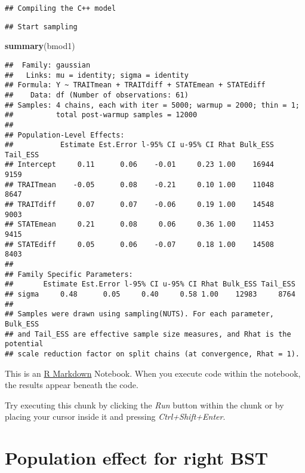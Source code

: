 \documentclass[
]{article}
\newenvironment{Shaded}{\begin{snugshade}}{\end{snugshade}}
\newcommand{\KeywordTok}[1]{\textcolor[rgb]{0.13,0.29,0.53}{\textbf{#1}}}
\newcommand{\NormalTok}[1]{#1}
\begin{document}
\begin{verbatim}
## Compiling the C++ model
\end{verbatim}

\begin{verbatim}
## Start sampling
\end{verbatim}

\begin{Shaded}
\begin{Highlighting}[]
\KeywordTok{summary}\NormalTok{(bmod1)}
\end{Highlighting}
\end{Shaded}

\begin{verbatim}
##  Family: gaussian 
##   Links: mu = identity; sigma = identity 
## Formula: Y ~ TRAITmean + TRAITdiff + STATEmean + STATEdiff 
##    Data: df (Number of observations: 61) 
## Samples: 4 chains, each with iter = 5000; warmup = 2000; thin = 1;
##          total post-warmup samples = 12000
## 
## Population-Level Effects: 
##           Estimate Est.Error l-95% CI u-95% CI Rhat Bulk_ESS Tail_ESS
## Intercept     0.11      0.06    -0.01     0.23 1.00    16944     9159
## TRAITmean    -0.05      0.08    -0.21     0.10 1.00    11048     8647
## TRAITdiff     0.07      0.07    -0.06     0.19 1.00    14548     9003
## STATEmean     0.21      0.08     0.06     0.36 1.00    11453     9415
## STATEdiff     0.05      0.06    -0.07     0.18 1.00    14508     8403
## 
## Family Specific Parameters: 
##       Estimate Est.Error l-95% CI u-95% CI Rhat Bulk_ESS Tail_ESS
## sigma     0.48      0.05     0.40     0.58 1.00    12983     8764
## 
## Samples were drawn using sampling(NUTS). For each parameter, Bulk_ESS
## and Tail_ESS are effective sample size measures, and Rhat is the potential
## scale reduction factor on split chains (at convergence, Rhat = 1).
\end{verbatim}

This is an \href{http://rmarkdown.rstudio.com}{R Markdown} Notebook.
When you execute code within the notebook, the results appear beneath
the code.

Try executing this chunk by clicking the \emph{Run} button within the
chunk or by placing your cursor inside it and pressing
\emph{Ctrl+Shift+Enter}.

\hypertarget{population-effect-for-right-bst-1}{%
\section{Population effect for right
BST}\label{population-effect-for-right-bst-1}}
\end{document}
